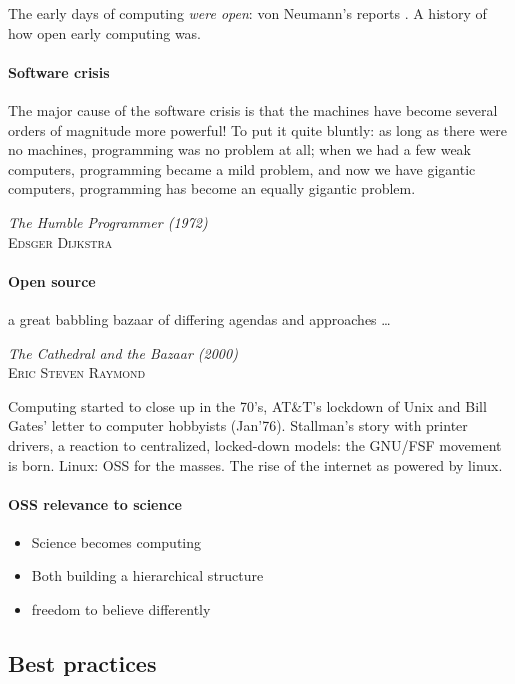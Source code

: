 \documentclass[ChapterTOCs,krantz2]{krantz} %
\begin{document}
The early days of computing \emph{were open}: von Neumann's reports
\cite{grcar2011john}.  A history
of how open early computing was. 


\paragraph{ {\bf Software crisis}}

\setlength{\epigraphrule}{0pt}
\setlength{\epigraphwidth}{.65\textwidth}
\epigraph%
{%
  The major cause of the software crisis is that the machines have become
  several orders of magnitude more powerful! To put it quite bluntly: as long
  as there were no machines, programming was no problem at all; when we had a
  few weak computers, programming became a mild problem, and now we have
  gigantic computers, programming has become an equally gigantic problem.
}%
{\textit{The Humble Programmer (1972)}\\ \textsc{Edsger Dijkstra} }


\paragraph{ {\bf Open source}}

\setlength{\epigraphrule}{0pt}
\setlength{\epigraphwidth}{.65\textwidth}
\epigraph%
{%
  a great babbling bazaar of differing agendas and approaches \ldots
}%
{\textit{The Cathedral and the Bazaar (2000)}\\ \textsc{Eric Steven Raymond} }

Computing started to close up in the 70's, AT\&T's lockdown of Unix
and Bill Gates' letter to computer hobbyists (Jan'76). Stallman's
story with printer drivers, a reaction to centralized, locked-down
models: the GNU/FSF movement is born. Linux: OSS for the masses. The
rise of the internet as powered by linux.


\paragraph{ {\bf OSS relevance to science}}
\begin{itemize}
\item Science becomes computing
\item Both building a hierarchical structure
\item freedom to believe differently
\end{itemize}




\subsection{Best practices}
\end{document}
